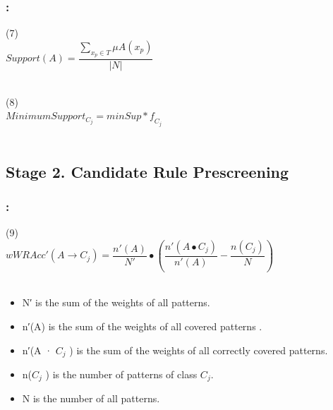 \documentclass{beamer}
\begin{document}
\begin{CJK*}{UTF8}{bsmi}

\begin{frame}
	\frametitle{\insertsection : \insertsubsection}
	
	\begin{block}{ (7)}
		~\\
		\centering\textbf{$Support(A)=\dfrac{\sum_{x_{p}\in T}^{ }{\mu A(x_{p})}}{|N|}$}\\
		~\\
	\end{block}
	\begin{block}{ (8)}
		~\\
		\centering\textbf{$MinimumSupport_{C_{j}}=minSup\ast \mathit{f}_{C_{j}}$}\\
		~\\
	\end{block}
	
\end{frame}


\subsection{Stage 2. Candidate Rule Prescreening}


\begin{frame}
	\frametitle{\insertsection : \insertsubsection}
	
	\begin{block}{ (9)}
		~\\
		\centering\textbf{$wWRAcc'  (A\longrightarrow C_{j})=\dfrac{n'(A)}{N'}\bullet(\dfrac{n'(A\bullet C_{j})}{n'(A)}-\dfrac{n(C_{j})}{N})$}\\
		~\\
	\end{block}
		\begin{itemize}
			\item N′ is the sum of the weights of all patterns.
			\item n′(A) is the sum of the weights of all covered patterns .
			\item n′(A · $C_{j}$ ) is the sum of the weights of all correctly covered patterns.
			\item n($C_{j}$ ) is the number of patterns of class $C_{j}$.  
			\item N is the number of all patterns. 
			

\end{itemize}
\end{frame}
\end{CJK*}
\end{document}
